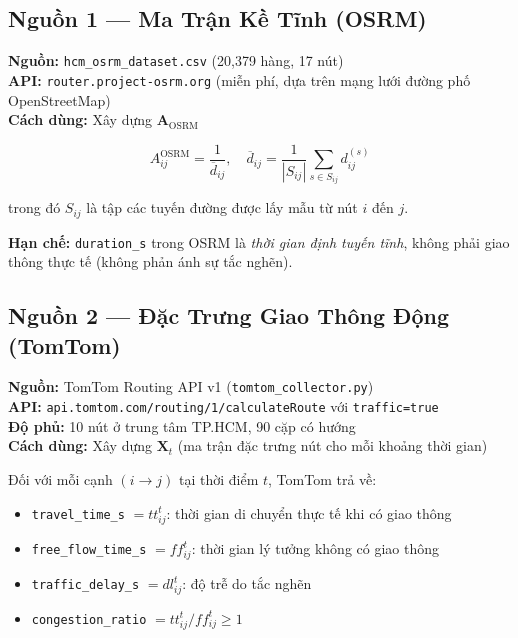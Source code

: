 \documentclass[12pt,a4paper]{article}
\begin{document}
\subsection{Nguồn 1 — Ma Trận Kề Tĩnh (OSRM)}

\textbf{Nguồn:} \texttt{hcm\_osrm\_dataset.csv} (20,379 hàng, 17 nút)\\
\textbf{API:} \texttt{router.project-osrm.org} (miễn phí, dựa trên mạng lưới đường phố OpenStreetMap)\\
\textbf{Cách dùng:} Xây dựng $\mathbf{A}_{\text{OSRM}}$

\begin{equation}
A_{ij}^{\text{OSRM}} = \frac{1}{\overline{d}_{ij}}, \quad
\overline{d}_{ij} = \frac{1}{|S_{ij}|} \sum_{s \in S_{ij}} d_{ij}^{(s)}
\end{equation}

trong đó $S_{ij}$ là tập các tuyến đường được lấy mẫu từ nút $i$ đến $j$.

\textbf{Hạn chế:} \texttt{duration\_s} trong OSRM là \textit{thời gian định tuyến tĩnh},
không phải giao thông thực tế (không phản ánh sự tắc nghẽn).

\subsection{Nguồn 2 — Đặc Trưng Giao Thông Động (TomTom)}

\textbf{Nguồn:} TomTom Routing API v1 (\texttt{tomtom\_collector.py})\\
\textbf{API:} \texttt{api.tomtom.com/routing/1/calculateRoute} với \texttt{traffic=true}\\
\textbf{Độ phủ:} 10 nút ở trung tâm TP.HCM, 90 cặp có hướng\\
\textbf{Cách dùng:} Xây dựng $\mathbf{X}_t$ (ma trận đặc trưng nút cho mỗi khoảng thời gian)

Đối với mỗi cạnh $(i \to j)$ tại thời điểm $t$, TomTom trả về:
\begin{itemize}
    \item \texttt{travel\_time\_s} $= tt_{ij}^t$: thời gian di chuyển thực tế khi có giao thông
    \item \texttt{free\_flow\_time\_s} $= ff_{ij}^t$: thời gian lý tưởng không có giao thông
    \item \texttt{traffic\_delay\_s} $= dl_{ij}^t$: độ trễ do tắc nghẽn
    \item \texttt{congestion\_ratio} $= tt_{ij}^t / ff_{ij}^t \geq 1$
\end{itemize}
\end{document}
